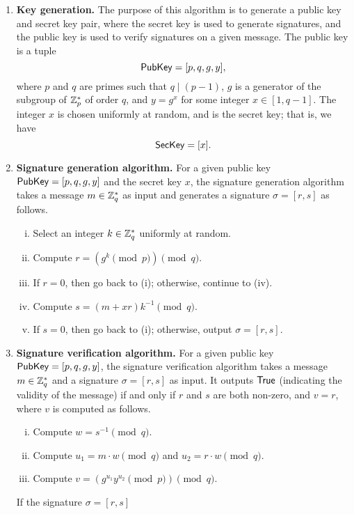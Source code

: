 \begin{enumerate}
    \item \textbf{Key generation.} The purpose of this algorithm is to generate a 
    public key and secret key pair, where the secret key is used to generate signatures, 
    and the public key is used to verify signatures on a given message. The 
    public key is a tuple 
    \[ {\sf PubKey} = [p, q, g, y], \] 
    where $p$ and $q$ are primes such that $q \mid (p-1)$, $g$ is a generator of the 
    subgroup of $\mathbb{Z}_p^*$ of order $q$, and $y = g^x$ for some integer $x \in [1, 
    q-1]$. The integer $x$ is chosen uniformly at random, and is the secret key; 
    that is, we have 
    \[ {\sf SecKey} = [x]. \] 

    \item \textbf{Signature generation algorithm.} For a given public key 
    ${\sf PubKey} = [p, q, g, y]$ and the secret key $x$, the signature generation 
    algorithm takes a message $m \in \mathbb{Z}_q^*$ as input and generates a signature 
    $\sigma = [r, s]$ as follows. 
    \begin{enumerate}[(i)]
        \item Select an integer $k \in \mathbb{Z}_q^*$ uniformly at random.
        \item Compute $r = (g^k \pmod p) \pmod q$. 
        \item If $r = 0$, then go back to (i); otherwise, continue to (iv). 
        \item Compute $s = (m + xr)k^{-1} \pmod q$. 
        \item If $s = 0$, then go back to (i); otherwise, output $\sigma = [r, s]$. 
    \end{enumerate}

    \item \textbf{Signature verification algorithm.} For a given public key 
    ${\sf PubKey} = [p, q, g, y]$, the signature verification algorithm takes a 
    message $m \in \mathbb{Z}_q^*$ and a signature $\sigma = [r, s]$ as input.
    It outputs ${\sf True}$ (indicating the validity of the message) if and only if 
    $r$ and $s$ are both non-zero, and $v = r$, where $v$ is computed as follows. 
    \begin{enumerate}[(i)]
        \item Compute $w = s^{-1} \pmod q$. 
        \item Compute $u_1 = m \cdot w \pmod q$ and $u_2 = r \cdot w \pmod q$. 
        \item Compute $v = (g^{u_1} y^{u_2} \pmod p) \pmod q$. 
    \end{enumerate}
    If the signature $\sigma = [r, s]$ 
\end{enumerate}